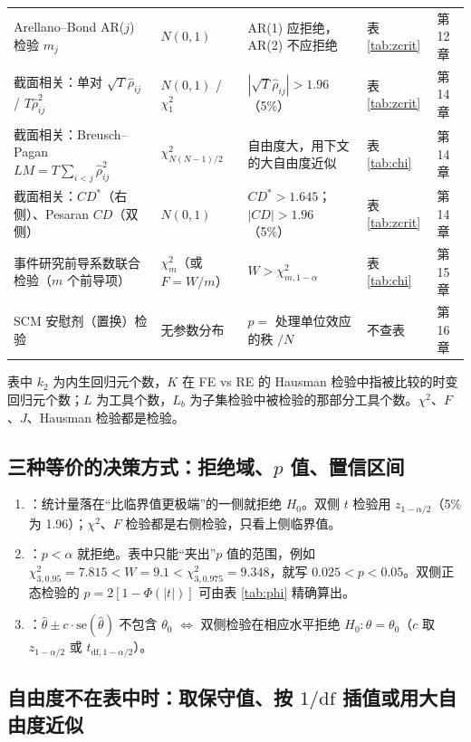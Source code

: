 {\begin{longtable}{@{}>{\raggedright\arraybackslash}p{4.2cm}>{\raggedright\arraybackslash}p{2.8cm}>{\raggedright\arraybackslash}p{4.0cm}>{\raggedright\arraybackslash}p{1.8cm}>{\raggedright\arraybackslash}p{1.5cm}@{}}
\addlinespace[1pt]
Arellano--Bond AR($j$) 检验 $m_j$ & $N(0,1)$ & AR(1) 应拒绝，AR(2) 不应拒绝 & 表 \ref{tab:zcrit} & 第 12 章\\
\addlinespace[1pt]
截面相关：单对 $\sqrt T\hat\rho_{ij}$ / $T\hat\rho_{ij}^2$ & $N(0,1)$ / $\chi^2_1$ & $|\sqrt T\hat\rho_{ij}|>1.96$（5\%） & 表 \ref{tab:zcrit} & 第 14 章\\
\addlinespace[1pt]
截面相关：Breusch--Pagan $LM=T\sum_{i<j}\hat\rho_{ij}^2$ & $\chi^2_{N(N-1)/2}$ & 自由度大，用下文的大自由度近似 & 表 \ref{tab:chi} & 第 14 章\\
\addlinespace[1pt]
截面相关：$CD^*$（右侧）、Pesaran $CD$（双侧） & $N(0,1)$ & $CD^*>1.645$；$|CD|>1.96$（5\%） & 表 \ref{tab:zcrit} & 第 14 章\\
\addlinespace[1pt]
事件研究前导系数联合检验（$m$ 个前导项） & $\chi^2_m$（或 $F=W/m$） & $W>\chi^2_{m,1-\alpha}$ & 表 \ref{tab:chi} & 第 15 章\\
\addlinespace[1pt]
SCM 安慰剂（置换）检验 & 无参数分布 & $p=$ 处理单位效应的秩 $/N$ & 不查表 & 第 16 章\\
\end{longtable}}

表中 $k_2$ 为内生回归元个数，$K$ 在 FE vs RE 的 Hausman 检验中指被比较的时变回归元个数；$L$ 为工具个数，$L_b$ 为子集检验中被检验的那部分工具个数。$\chi^2$、$F$、$J$、Hausman 检验都是检验。

\subsection{三种等价的决策方式：拒绝域、\texorpdfstring{$p$}{p} 值、置信区间}

\begin{enumerate}
  \item {}：统计量落在“比临界值更极端”的一侧就拒绝 $H_0$。双侧 $t$ 检验用 $z_{1-\alpha/2}$（5\% 为 1.96）；$\chi^2$、$F$ 检验都是右侧检验，只看上侧临界值。
  \item {}：$p<\alpha$ 就拒绝。表中只能“夹出”$p$ 值的范围，例如 $\chi^2_{3,0.95}=7.815<W=9.1<\chi^2_{3,0.975}=9.348$，就写 $0.025<p<0.05$。双侧正态检验的 $p=2[1-\Phi(|t|)]$ 可由表 \ref{tab:phi} 精确算出。
  \item {}：$\hat\theta\pm c\cdot\mathrm{se}(\hat\theta)$ 不包含 $\theta_0$ $\iff$ 双侧检验在相应水平拒绝 $H_0:\theta=\theta_0$（$c$ 取 $z_{1-\alpha/2}$ 或 $t_{\mathrm{df},1-\alpha/2}$）。
\end{enumerate}

\subsection{自由度不在表中时：取保守值、按 \texorpdfstring{$1/\mathrm{df}$}{1/df} 插值或用大自由度近似}

